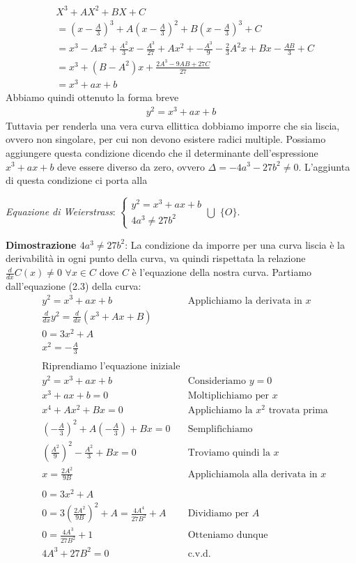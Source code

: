 \documentclass[a4paper,12pt]{tesiinfo}
\newcommand\ddfrac[2]{\frac{\displaystyle #1}{\displaystyle #2}}
\begin{document}
\begin{align*}
&X^3 + AX^2 + BX + C 
\\
&=\left(x- \ddfrac{A}{3} \right )^3 +A\left ( x - \ddfrac{A}{3} \right )^2 + B\left (x - \ddfrac{A}{3} \right )^3 +C
\\
&= x^3-Ax^2 + \ddfrac{A^2}{3}x - \ddfrac{A^3}{27} + Ax^2 + - \ddfrac{A^3}{9} -\ddfrac{2}{3}A^2x + Bx - \ddfrac{AB}{3} +C
\\
&= x^3 + (B-A^2)x + \ddfrac{2A^3-9AB+27C}{27}
\\
&= x^3 + ax+b
\end{align*}
Abbiamo quindi ottenuto la forma breve
\begin{gather}
y^2 = x^3 + ax+b
\end{gather}
Tuttavia per renderla una vera curva ellittica dobbiamo imporre che sia liscia, ovvero non singolare, per cui non devono esistere radici multiple. Possiamo aggiungere questa condizione dicendo che il determinante dell'espressione $x^3 + ax+b$ deve essere diverso da zero, ovvero $\Delta = -4a^3 - 27b^2 \ne 0$. L'aggiunta di questa condizione ci porta alla
\begin{center}
\textit{Equazione di Weierstrass}:
$\begin{cases}
y^2 = x^3 + ax+b\\
4a^3 \ne 27b^2\end{cases}
\bigcup $ $\{O\}$.\\
\end{center}
\textbf{Dimostrazione $4a^3 \ne 27b^2$}: La condizione da imporre per una curva liscia \`e la derivabilit\`a in ogni punto della curva, va quindi rispettata la relazione\\ $\ddfrac{d}{dx}C(x) \ne 0$ $ \forall x \in C$ dove $C$ \`e l'equazione della nostra curva. Partiamo dall'equazione (2.3) della curva: 
\begin{align*}
&y^2 = x^3 + ax+b &\text{Applichiamo la derivata in $x$}\\
&\ddfrac{d}{dx}y^2 = \ddfrac{d}{dx}(x^3 +Ax+B)\\
&0 = 3x^2 +A\\
&x^2 = -\ddfrac{A}{3}\\
\\
&\text{Riprendiamo l'equazione iniziale}\\
&y^2 = x^3 + ax+b &\text{Consideriamo $y=0$}\\
&x^3 + ax+b = 0 &\text{Moltiplichiamo per $x$}\\
&x^4 + Ax^2+Bx = 0 &\text{Applichiamo la $x^2$ trovata prima}\\
&(-\ddfrac{A}{3})^2 + A(-\ddfrac{A}{3})+Bx = 0 &\text{Semplifichiamo}\\
&(\ddfrac{A^2}{9})^2 - \ddfrac{A^2}{3}+Bx = 0 &\text{Troviamo quindi la $x$}\\
&x = \ddfrac{2A^2}{9B}
&\text{Applichiamola alla derivata in $x$}\\
\\
&0 = 3x^2 +A\\
&0 = 3(\ddfrac{2A^2}{9B})^2 +A = \ddfrac{4A^4}{27B^2} +A &\text{Dividiamo per $A$}\\
&0 = \ddfrac{4A^3}{27B^2} +1 &\text{Otteniamo dunque}\\
&4A^3+27B^2 = 0 &\text{c.v.d.}
\end{align*}
\end{document}
